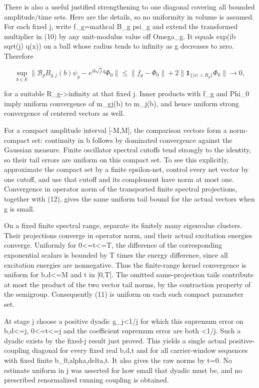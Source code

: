 \documentclass[
  11pt,
]{article}
\begin{document}
There is also a useful justified strengthening to one diagonal covering
all bounded amplitude/time sets. Here are the details, so no uniformity
in volume is assumed. For each fixed j, write f\_g=mathcal B\_g psi\_g
and extend the transformed multiplier in (10) by any unit-modulus value
off Omega\_g. It equals exp(ib sqrt(j) q(x)) on a ball whose radius
tends to infinity as g decreases to zero. Therefore

\[
 \sup_{b\in\mathbb R}
 \|\mathcal B_g B_{g,j}(b)\psi_g-e^{ib\sqrt j q}\Phi_0\|
 \le \|f_g-\Phi_0\|
       +2\|\mathbf1_{\{|x|>R_g\}}\Phi_0\|
 \longrightarrow0,
 \tag{12}
\]

for a suitable R\_g-\textgreater infinity at that fixed j. Inner
products with f\_g and Phi\_0 imply uniform convergence of m\_gj(b) to
m\_j(b), and hence uniform strong convergence of centered vectors as
well.

For a compact amplitude interval {[}-M,M{]}, the comparison vectors form
a norm-compact set: continuity in b follows by dominated convergence
against the Gaussian measure. Finite oscillator spectral cutoffs tend
strongly to the identity, so their tail errors are uniform on this
compact set. To see this explicitly, approximate the compact set by a
finite epsilon-net, control every net vector by one cutoff, and use that
cutoff and its complement have norm at most one. Convergence in operator
norm of the transported finite spectral projections, together with (12),
gives the same uniform tail bound for the actual vectors when g is
small.

On a fixed finite spectral range, separate its finitely many eigenvalue
clusters. Their projections converge in operator norm, and their actual
excitation energies converge. Uniformly for 0\textless=t\textless=T, the
difference of the corresponding exponential scalars is bounded by T
times the energy difference, since all excitation energies are
nonnegative. Thus the finite-range kernel convergence is uniform for
\textbar b\textbar,\textbar d\textbar\textless=M and t in {[}0,T{]}. The
omitted same-projection tails contribute at most the product of the two
vector tail norms, by the contraction property of the semigroup.
Consequently (11) is uniform on each such compact parameter set.

At stage j choose a positive dyadic g\_j\textless1/j for which this
supremum error on \textbar b\textbar,\textbar d\textbar\textless=j,
0\textless=t\textless=j and the coefficient supremum error are both
\textless1/j. Such a dyadic exists by the fixed-j result just proved.
This yields a single actual positive-coupling diagonal for every fixed
real b,d,t and for all carrier-window sequences with fixed finite
b\_0,alpha,delta,t. It also gives the raw norms by t=0. No estimate
uniform in j was asserted for how small that dyadic must be, and no
prescribed renormalized running coupling is obtained.
\end{document}
